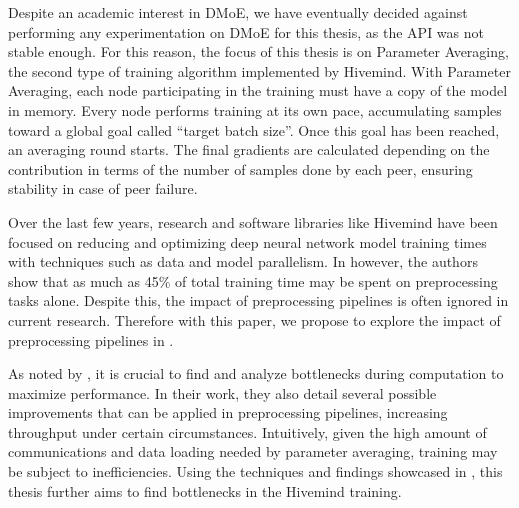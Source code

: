 
Despite an academic interest in DMoE, we have eventually decided against performing any experimentation on DMoE for this thesis, as the API was not stable enough.
For this reason, the focus of this thesis is on Parameter Averaging, the second type of training algorithm implemented by Hivemind.
With Parameter Averaging, each node participating in the training must have a copy of the model in memory.
Every node performs training at its own pace, accumulating samples toward a global goal called ``target batch size''.
Once this goal has been reached, an averaging round starts.
The final gradients are calculated depending on the contribution in terms of the number of samples done by each peer, ensuring stability in case of peer failure.

Over the last few years, research and software libraries like Hivemind have been focused on reducing and optimizing deep neural network model training times with techniques such as data and model parallelism.
In \cite{xin2021production} however, the authors show that as much as 45\% of total training time may be spent on preprocessing tasks alone.
Despite this, the impact of preprocessing pipelines is often ignored in current research.
Therefore with this paper, we propose to explore the impact of preprocessing pipelines in \cite{hivemind}.

As noted by \citeauthor{isenko2022bottleneck} \cite{isenko2022bottleneck}, it is crucial to find and analyze bottlenecks during computation to maximize performance.
In their work, they also detail several possible improvements that can be applied in preprocessing pipelines, increasing throughput under certain circumstances.
Intuitively, given the high amount of communications and data loading needed by parameter averaging, training may be subject to inefficiencies.
Using the techniques and findings showcased in \cite{isenko2022bottleneck}, this thesis further aims to find bottlenecks in the Hivemind training.

